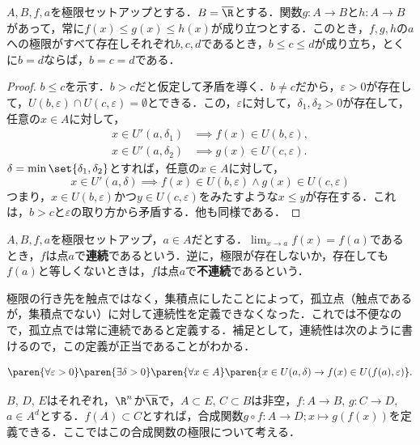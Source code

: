 \documentclass[a4paper,10pt]{ltjsarticle}
\begin{document}
\begin{MyProposition}
  \(A, B, f, a\)を極限セットアップとする．\(B = \overline\R\)とする．関数\(g : A \to B\)と\(h : A \to B\)があって，常に\(f(x) \le g(x) \le h(x)\)が成り立つとする．このとき，\(f, g, h\)の\(a\)への極限がすべて存在しそれぞれ\(b, c, d\)であるとき，\(b \le c \le d\)が成り立ち，とくに\(b = d\)ならば，\(b = c = d\)である．
\end{MyProposition}
\begin{proof}
  \(b \le c\)を示す．\(b > c\)だと仮定して矛盾を導く．\(b \ne c\)だから，\(\varepsilon > 0\)が存在して，\(U(b, \varepsilon) \cap U(c, \varepsilon) = \emptyset\)とできる．この，\(\varepsilon\)に対して，\(\delta_1, \delta_2 > 0\)が存在して，任意の\(x \in A\)に対して，
  \begin{align*}
    x \in U'(a, \delta_1) & \implies f(x) \in U(b, \varepsilon), \\
    x \in U'(a, \delta_2) & \implies g(x) \in U(c, \varepsilon).
  \end{align*}
  \(\delta = \min\set{\delta_1, \delta_2}\)とすれば，任意の\(x \in A\)に対して，
  \[
    x \in U'(a, \delta) \implies f(x) \in U(b, \varepsilon) \land g(x) \in U(c, \varepsilon) \]
  つまり，\(x \in U(b, \varepsilon)\)かつ\(y \in U(c, \varepsilon)\)をみたすような\(x \le y\)が存在する．これは，\(b > c\)と\(\varepsilon\)の取り方から矛盾する．他も同様である．
\end{proof}

\begin{MyDefinition}[連続][continuity]
  \(A, B, f, a\)を極限セットアップ，\(a \in A\)だとする．\(\lim_{x \to a} f(x) = f(a)\)であるとき，\(f\)は点\(a\)で\textbf{連続}であるという．逆に，極限が存在しないか，存在しても\(f(a)\)と等しくないときは，\(f\)は点\(a\)で\textbf{不連続}であるという．
\end{MyDefinition}

極限の行き先を触点ではなく，集積点にしたことによって，孤立点（触点であるが，集積点でない）に対して連続性を定義できなくなった．これでは不便なので，孤立点では常に連続であると定義する．補足として，連続性は次のように書けるので，この定義が正当であることがわかる．

\[ \paren{\forall \varepsilon > 0}\paren{\exists \delta > 0}\paren{\forall x \in A}\paren{x \in U(a, \delta) \to f(x) \in U(f(a), \varepsilon)}. \]

\(B\), \(D\), \(E\)はそれぞれ，\(\R^n\)か\(\overline\R\)で，\(A \subset E\), \(C \subset B\)は非空，\(f: A \to B\), \(g: C \to D\), \(a \in A^d\)とする．\(f(A)\subset C\)とすれば，合成関数\(g\circ f: A \to D; x \mapsto g(f(x))\)を定義できる．ここではこの合成関数の極限について考える．
\end{document}
